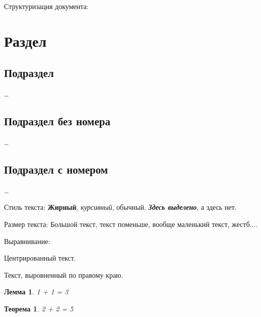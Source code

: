 


    
    Структуризация документа:
    \section{Раздел}
    \subsection{Подраздел}
    \dots %
    \subsection*{Подраздел без номера}
    \dots %
    \subsection{Подраздел с номером}
    \dots %

    Стиль текста:
    \textbf{Жирный}, \textit{курсивный}, обычный.
    {\bfseries \itshape Здесь выделено}, а здесь нет.
    
    Размер текста:
    {\Large Большой текст}, текст поменьше, {\small вообще маленький текст, жестб...}.

     Выравнивание:
     \begin{center}
         Центрированный текст.
     \end{center}

    \begin{flushright}
        Текст, выровненный по правому краю.
    \end{flushright}
    
    \usepackage{amsthm}
    \theoremstyle{plain}
    \newtheorem{theorem}{Теорема}
    \newtheorem{lemma}{Лемма}

    \begin{lemma}
        1 + 1 = 3
    \end{lemma}

    \begin{theorem}
        2 + 2 = 5
    \end{theorem}



